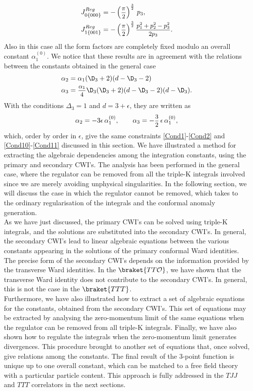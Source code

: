 \documentclass[a4paper,11pt,openright,twoside]{book}
\newcommand{\mO}{\mathcal{O}}
\let\a=\alpha   \let\b=\beta   \let\g=\gamma   \let\d=\delta
\let\e=\epsilon \let\z=\zeta   \let\h=\eta     \let\q=\theta
\newcommand{\sdfrac}[2]{\mbox{\small$\displaystyle\frac{#1}{#2}$}}
\numberwithin{equation}{section}
\begin{document}
{{{\begin{align}
	J^{Reg}_{0\{000\}}&=-\left(\sdfrac{\pi}{2}\right)^\frac{3}{2}\,p_3,\\
	J^{Reg}_{1\{001\}}&=-\left(\sdfrac{\pi}{2}\right)^\frac{3}{2}\sdfrac{p_1^2+p_2^2-p_3^2}{2p_3}.
\end{align}
Also in this case all the form factors are completely fixed modulo an overall constant $\alpha_1^{(0)}$. We notice that these results are in agreement with the relations between the constants obtained in the general case 
\begin{align}
	\a_2&=\a_1(\D_3+2)(d-\D_3-2)\\
	\a_3&=\sdfrac{\a_1}{4}\D_3(\D_3+2)(d-\D_3-2)(d-\D_3).
\end{align}
With the conditions $\Delta_3=1$ and $d=3+\e$, they are written as
\begin{equation}
	\a_2=-3\e\,\a_1^{(0)},\qquad\a_3=-\sdfrac{3}{2}\,\e\,\a_1^{(0)},
\end{equation}
which, order by order in $\e$, give the same constraints \eqref{Cond1}-\eqref{Cond2} and \eqref{Cond10}-\eqref{Cond11} discussed in this section. 
We have illustrated a method \cite{Bzowski:2013sza} for extracting the algebraic dependencies among the integration constants, using the primary and secondary CWI's. The analysis has been performed in the general case, where the regulator can be removed from all the triple-K integrals involved since we are merely avoiding unphysical singularities. In the following section, we will discuss the case in which the regulator cannot be removed, which takes to the ordinary regularisation of the integrals and the conformal anomaly generation.\\
As we have just discussed, the primary CWI's can be solved using triple-K integrals, and the solutions are substituted into the secondary CWI's. In general, the secondary CWI's lead to linear algebraic equations between the various constants appearing in the solutions of the primary conformal Ward identities. The precise form of the secondary CWI's depends on the information provided by the transverse Ward identities. In the $\braket{TT\mO}$, we have shown that the transverse Ward identity does not contribute to the secondary CWI's. In general, this is not the case in the $\braket{TTT}$. \\
Furthermore, we have also illustrated how to extract a set of algebraic equations for the constants, obtained from the secondary CWI's. This set of equations may be extracted by analysing the zero-momentum limit of the same equations when the regulator can be removed from all triple-K integrals. Finally, we have also shown how to regulate the integrals when the zero-momentum limit generates divergences. This procedure brought to another set of equations that, once solved, give relations among the constants. The final result of the 3-point function is unique up to one overall constant, which can be matched to a free field theory with a particular particle content. This approach is fully addressed in the $TJJ$ and $TTT$ correlators in the next sections. 

}}}
\end{document}

